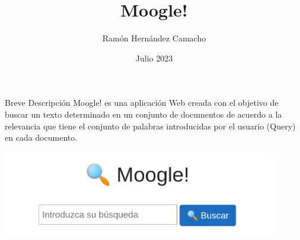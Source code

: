 \documentclass{beamer}
\title{Moogle!}
\author{Ramón Hernández Camacho}
\date{Julio 2023}
\begin{document}
\maketitle

\begin{frame}{Breve Descripción}
    Moogle! es una aplicación Web creada con el objetivo de buscar un texto determinado
    en un conjunto de documentos de acuerdo a la relevancia que tiene el conjunto de
    palabras introducidas por el usuario (Query) en cada documento.
    \begin{center}

        \includegraphics[width=12cm]{moogle.png}

    \end{center}


\end{frame}
\end{document}
